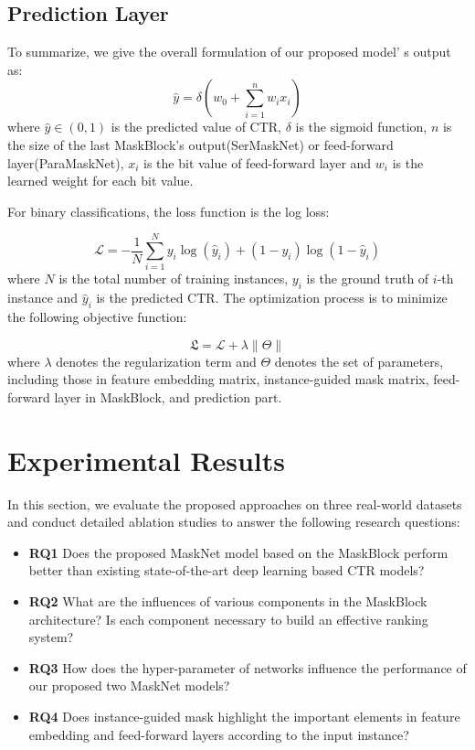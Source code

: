\documentclass[sigconf]{acmart}
\begin{document}
\subsection{Prediction Layer}
To summarize, we give the overall formulation of our proposed model’ s output as:
\begin{equation}
  \hat{y} = \delta(w_0 + \sum^n_{i=1}w_ix_i)
\end{equation}
where $\hat{y} \in (0, 1)$ is the predicted value of CTR, $\delta$ is the sigmoid function, $n$ is the size of the last MaskBlock's output(SerMaskNet) or feed-forward layer(ParaMaskNet), $x_i$ is the bit value of feed-forward layer and $w_i$ is the learned weight for each bit value.


For binary classifications, the loss function is the log loss:

\begin{equation}
  \mathcal{L} = -\frac{1}{N}\sum^N_{i=1}y_i\log(\hat{y}_i)+(1-y_i)\log(1-\hat{y}_i)
\end{equation}
where $N$ is the total number of training instances, $y_i$ is the ground truth of $i$-th instance and $\hat{y}_i$ is the predicted CTR. The optimization process is to minimize the following objective function:

\begin{equation}
\mathfrak{L} = \mathcal{L} + \lambda \|\Theta\|
\end{equation}
where $\lambda$ denotes the regularization term and $\Theta$ denotes the set of parameters, including those in feature embedding matrix, instance-guided mask matrix, feed-forward layer in MaskBlock, and prediction part.


\section{Experimental Results}
In this section, we evaluate the proposed approaches on three real-world datasets and conduct detailed ablation studies to answer the following research questions:

\begin{itemize}
\item\noindent\textbf{RQ1} Does the proposed MaskNet model based on the  MaskBlock perform better than existing state-of-the-art  deep learning based CTR models?
\item\noindent\textbf{RQ2} What are the influences of various components in the MaskBlock architecture? Is each component  necessary to build an effective ranking system?
\item\noindent\textbf{RQ3} How does the hyper-parameter of networks influence the performance of our proposed  two MaskNet models?
\item\noindent\textbf{RQ4} Does instance-guided mask highlight the important elements in feature embedding and feed-forward layers according to the input instance?
\end{itemize}
\end{document}
